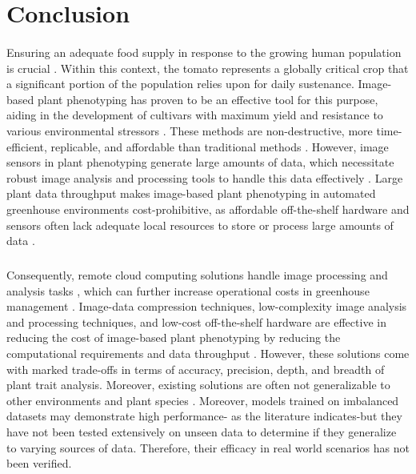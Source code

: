 \section{Conclusion}

\paragraph{}
Ensuring an adequate food supply in response to the growing human population is crucial \cite{carvajal-yepesGlobalSurveillanceSystem2019}. Within this context, the tomato represents a globally critical crop that a significant portion of the population relies upon for daily sustenance. Image-based plant phenotyping has proven to be an effective tool for this purpose, aiding in the development of cultivars with maximum yield and resistance to various environmental stressors \cite{anandBreedingTechniquesDispense2023}. These methods are non-destructive, more time-efficient, replicable, and affordable than traditional methods \cite{daschoudhuryLeveragingImageAnalysis2019}. However, image sensors in plant phenotyping generate large amounts of data, which necessitate robust image analysis and processing tools to handle this data effectively \cite{gomesComputationalSustainabilityComputational2009}. Large plant data throughput makes image-based plant phenotyping in automated greenhouse environments cost-prohibitive, as affordable off-the-shelf hardware and sensors often lack adequate local resources to store or process large amounts of data \cite{bauckhageDataMiningPattern2013}.

\subparagraph{}
Consequently, remote cloud computing solutions handle image processing and analysis tasks \cite{debaucheCloudArchitecturePlant2020}, which can further increase operational costs in greenhouse management \cite{minerviniImageAnalysisNew2015}. Image-data compression techniques, low-complexity image analysis and processing techniques, and low-cost off-the-shelf hardware are effective in reducing the cost of image-based plant phenotyping by reducing the computational requirements and data throughput \cite{minerviniApplicationawareImageCompression2013, tovarRaspberryPiPowered2018a, minerviniImageAnalysisNew2015}. However, these solutions come with marked trade-offs in terms of accuracy, precision, depth, and breadth of plant trait analysis. Moreover, existing solutions are often not generalizable to other environments and plant species \cite{arnalbarbedoDigitalImageProcessing2013, liReviewImagingTechniques2014}. Moreover,  models trained on imbalanced datasets may demonstrate high performance- as the literature indicates-but they have not been tested extensively on unseen data to determine if they generalize to varying sources of data. Therefore, their efficacy in real world scenarios has not been verified.

